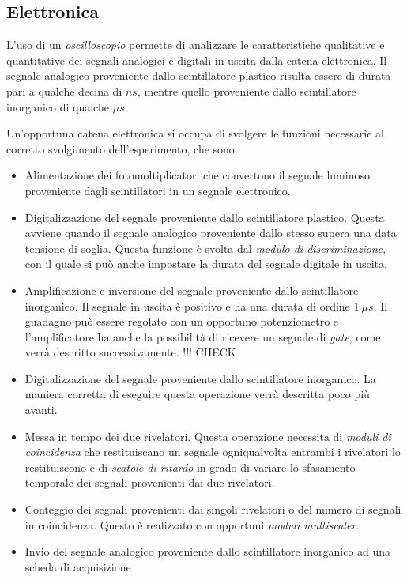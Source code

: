 \documentclass[8pt]{extarticle}
\begin{document}
\subsection{Elettronica}

L'uso di un \textit{oscilloscopio} permette di analizzare le caratteristiche qualitative e quantitative dei segnali analogici e digitali in uscita dalla catena elettronica. Il segnale analogico proveniente dallo scintillatore plastico risulta essere di durata pari a qualche decina di $ns$, mentre quello proveniente dallo scintillatore inorganico di qualche $\mu s$. 

Un'opportuna catena elettronica si occupa di svolgere le funzioni necessarie al corretto svolgimento dell'esperimento, che sono: \\

\begin{itemize}
\item Alimentazione dei fotomoltiplicatori che convertono il segnale luminoso proveniente dagli scintillatori in un segnale elettronico.
\item Digitalizzazione del segnale proveniente dallo scintillatore plastico. Questa avviene
quando il segnale analogico proveniente dallo stesso supera una data tensione di soglia. Questa funzione è svolta dal \textit{modulo di discriminazione}, con il quale si può anche impostare la durata del segnale digitale in uscita.
\item Amplificazione e inversione del segnale proveniente dallo scintillatore inorganico. Il segnale in uscita è positivo e ha una durata di ordine $1 \ \mu s$. Il guadagno può essere regolato con un opportuno potenziometro e l'amplificatore ha anche la possibilità di ricevere un segnale di \textit{gate}, come verrà descritto successivamente. !!! CHECK
\item Digitalizzazione del segnale proveniente dallo scintillatore inorganico. La maniera corretta di eseguire questa operazione verrà descritta poco più avanti.
\item Messa in tempo dei due rivelatori. Questa operazione necessita di \textit{moduli di coincidenza} che restituiscano un segnale ogniqualvolta entrambi i rivelatori lo restituiscono e di \textit{scatole di ritardo} in grado di variare lo sfasamento temporale dei segnali provenienti dai due rivelatori.
\item Conteggio dei segnali provenienti dai singoli rivelatori o del numero di segnali in coincidenza. Questo è realizzato con opportuni \textit{moduli multiscaler}.
\item Invio del segnale analogico proveniente dallo scintillatore inorganico ad una scheda di acquisizione
\end{itemize}
\end{document}

